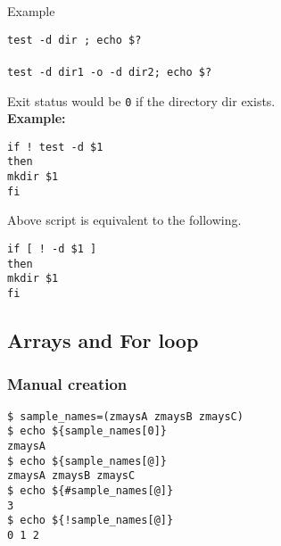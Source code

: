 Example\\

\begin{mdframed}
\texttt{test -d dir ; echo \$? }\\
\null\\
\texttt{test -d dir1 -o -d dir2; echo \$?}

\end{mdframed}





Exit status would be \texttt{0} if the directory dir exists.\\


\textbf{Example:}\\

\begin{mdframed}
\texttt{if ! test -d \$1}\\
\texttt{then}\\
\texttt{mkdir \$1}\\
\texttt{fi}
\end{mdframed}

Above script is equivalent to the following.\\

\begin{mdframed}
\texttt{if [ ! -d \$1 ]}\\
\texttt{then}\\
\texttt{mkdir \$1}\\
\texttt{fi}
\end{mdframed}

\null

\subsection{Arrays and For loop}

\subsubsection{Manual creation}
\begin{mdframed}

\texttt{\$ sample\_names=(zmaysA zmaysB zmaysC)}\\
\texttt{\$ echo \$\{sample\_names[0]\}}\\
\texttt{zmaysA}\\
\texttt{\$ echo \$\{sample\_names[@]\}}\\
\texttt{zmaysA zmaysB zmaysC}\\
\texttt{\$ echo \$\{\#sample\_names[@]\}}\\
\texttt{3}\\
\texttt{\$ echo \$\{!sample\_names[@]\}}\\
\texttt{0 1 2}
\end{mdframed}

